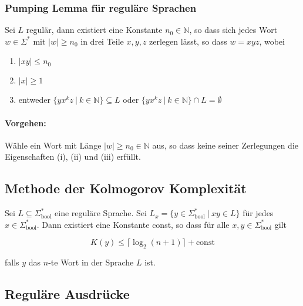 \documentclass[11pt]{article}
\begin{document}
\subsubsection{Pumping Lemma f{\"u}r regul{\"a}re Sprachen}

Sei $L$ regul{\"a}r, dann existiert eine Konstante $n_0 \in \mathbb{N}$, so dass sich jedes Wort $w \in \Sigma^*$ mit $|w| \geq n_0$ in drei Teile $x, y, z$ zerlegen l{\"a}sst, so dass $w = xyz$, wobei

\begin{enumerate}[label=(\roman*), noitemsep]
	\item $|xy| \leq n_0$
	\item $|x| \geq 1$
	\item entweder $\{yx^kz\ |\ k \in \mathbb{N}\} \subseteq L$ oder $\{yx^kz\ |\ k \in \mathbb{N}\} \cap L = \emptyset$
\end{enumerate}

\paragraph{Vorgehen:} W{\"a}hle ein Wort mit L{\"a}nge $|w| \geq n_0 \in \mathbb{N}$ aus, so dass keine seiner Zerlegungen die Eigenschaften (i), (ii) und (iii) erf{\"u}llt.

\subsection{Methode der Kolmogorov Komplexit{\"a}t}

Sei $L \subseteq \Sigma_\text{bool}^*$ eine regul{\"a}re Sprache. Sei $L_x = \{y \in \Sigma_\text{bool}^*\ |\ xy \in L\}$ f{\"u}r jedes $x \in \Sigma_\text{bool}^*$. Dann existiert eine Konstante const, so dass f{\"u}r alle $x,y \in \Sigma_\text{bool}^*$ gilt

\begin{equation*}
	K(y) \leq \lceil\log_2(n+1)\rceil + \text{const}
\end{equation*}

falls $y$ das $n$-te Wort in der Sprache $L$ ist.

\subsection{Regul{\"a}re Ausdr{\"u}cke}
\end{document}
